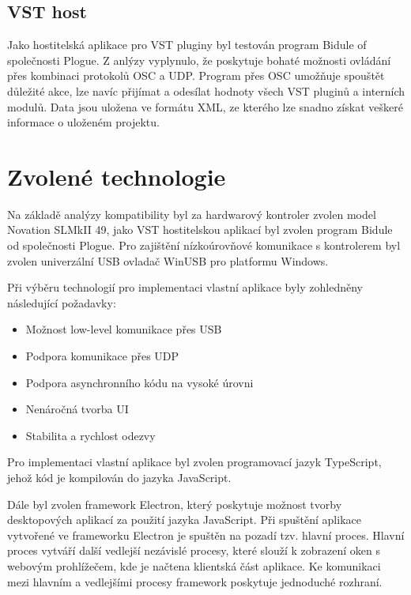 \documentclass[thesis=M,czech]{FITthesis}[2019/03/06]
\begin{document}
		\subsection{VST host}
		Jako hostitelská aplikace pro VST pluginy byl testován program Bidule of společnosti Plogue.
		Z anlýzy vyplynulo, že poskytuje bohaté možnosti ovládání přes kombinaci protokolů OSC a UDP.
		Program přes OSC umožňuje spouštět důležité akce, lze navíc přijímat a odesílat hodnoty všech VST pluginů a interních modulů.
		Data jsou uložena ve formátu XML, ze kterého lze snadno získat veškeré informace o uloženém projektu.
		
	\section{Zvolené technologie}
		Na základě analýzy kompatibility byl za hardwarový kontroler zvolen model Novation SLMkII 49, jako VST hostitelskou aplikací byl zvolen program Bidule od společnosti Plogue.
		Pro zajištění nízkoúrovňové komunikace s kontrolerem byl zvolen univerzální USB ovladač WinUSB pro platformu Windows.
	
		Při výběru technologií pro implementaci vlastní aplikace byly zohledněny následující požadavky:
		\begin{itemize}
			\item Možnost low-level komunikace přes USB
			\item Podpora komunikace přes UDP
			\item Podpora asynchronního kódu na vysoké úrovni
			\item Nenáročná tvorba UI
			\item Stabilita a rychlost odezvy
		\end{itemize}
			
		Pro implementaci vlastní aplikace byl zvolen programovací jazyk TypeScript, jehož kód je kompilován do jazyka JavaScript.

		Dále byl zvolen framework Electron, který poskytuje možnost tvorby desktopových aplikací za použití jazyka JavaScript.
		Při spuštění aplikace vytvořené ve frameworku Electron je spuštěn na pozadí tzv. hlavní proces.
		Hlavní proces vytváří další vedlejší nezávislé procesy, které slouží k zobrazení oken s webovým prohlížečem, kde je načtena klientská část aplikace.
		Ke komunikaci mezi hlavním a vedlejšími procesy framework poskytuje jednoduché rozhraní.
\end{document}
